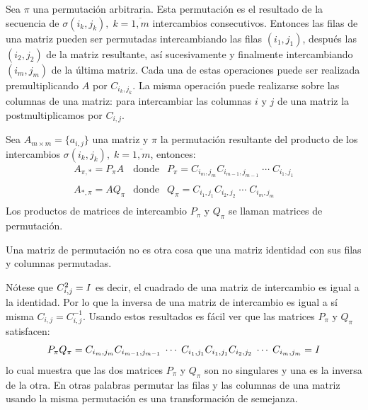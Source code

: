 Sea $\pi$ una permutación arbitraria. Esta permutación es el resultado de la secuencia de $\sigma(i_k, j_k),\; k=\overline{1,m}$ intercambios consecutivos. Entonces las filas de una matriz pueden ser permutadas intercambiando las filas $(i_1, j_1)$, después las $(i_2, j_2)$ de la matriz resultante, as\'i sucesivamente y finalmente intercambiando $(i_m, j_m)$ de la \'ultima matriz. Cada una de estas operaciones puede ser realizada premultiplicando $A$ por $C_{i_k, j_k}$. La misma operación puede realizarse sobre las columnas de una matriz: para intercambiar las columnas $i$ y $j$ de una matriz la postmultiplicamos por $C_{i,j}$.
\begin{lemma}\label{lm:dual_permutation}
	Sea $A_{m \times m} = \{a_{i,j}\}$ una matriz y $\pi$ la permutación resultante del producto de los intercambios $\sigma(i_k, j_k),\; k=\overline{1,m}$, entonces:
	\begin{equation}
		\begin{array}{rcl}
			A_{\pi,\ast} = P_\pi A &\mbox{donde}& P_\pi = C_{i_m, j_m}C_{i_{m-1}, j_{m-1}}\;\cdots\;C_{i_1, j_1}\\
			\\
			A_{\ast,\pi} = A Q_\pi &\mbox{donde}& Q_\pi = C_{i_1, j_1}C_{i_2, j_2}\;\cdots\;C_{i_m, j_m}\\
		\end{array}
	\end{equation}
	Los productos de matrices de intercambio $P_\pi$ y $Q_\pi$ se llaman matrices de permutación.
\end{lemma}

\begin{definition}
	Una matriz de permutación no es otra cosa que una matriz identidad con sus filas y columnas permutadas.
\end{definition}

N\'otese que $C_{i, j}^2 = \mathbb{\mathit{I}}$ es decir, el cuadrado de una matriz de intercambio es igual a la identidad. Por lo que la inversa de una matriz de intercambio es igual a sí misma $C_{i, j} = C_{i, j}^{-1}$. Usando estos resultados es fácil ver que las matrices $P_\pi$ y $Q_\pi$ satisfacen:
\begin{equation}
	P_\pi Q_\pi = C_{i_m, j_m}C_{i_{m-1}, j_{m-1}}\;\cdots\;C_{i_1, j_1} C_{i_1, j_1}C_{i_2, j_2}\;\cdots\;C_{i_m, j_m} = \mathbb{\mathit{I}}
	\label{eq:dual_permutation}
\end{equation}
lo cual muestra que las dos matrices $P_\pi$ y $Q_\pi$ son no singulares y una es la inversa de la otra. En otras palabras permutar las filas y las columnas de una matriz usando la misma permutación es una transformación de semejanza.

